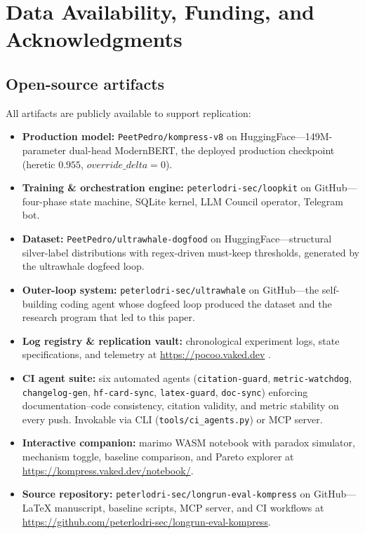 \section{Data Availability, Funding, and Acknowledgments}
\label{sec:data}

\subsection{Open-source artifacts}

All artifacts are publicly available to support replication:

\begin{itemize}
  \item \textbf{Production model:} \texttt{PeetPedro/kompress-v8} on
        HuggingFace---149M-parameter dual-head ModernBERT, the deployed
        production checkpoint (heretic $0.955$, $\mathit{override\_delta}{=}0$).
  \item \textbf{Training \& orchestration engine:}
        \texttt{peterlodri-sec/loopkit} on GitHub---four-phase state machine,
        SQLite kernel, LLM Council operator, Telegram bot.
  \item \textbf{Dataset:} \texttt{PeetPedro/ultrawhale-dogfood} on
        HuggingFace---structural silver-label distributions with regex-driven
        must-keep thresholds, generated by the ultrawhale dogfeed loop.
  \item \textbf{Outer-loop system:} \texttt{peterlodri-sec/ultrawhale} on
        GitHub---the self-building coding agent whose dogfeed loop produced
        the dataset and the research program that led to this paper.
  \item \textbf{Log registry \& replication vault:} chronological experiment
        logs, state specifications, and telemetry at
        \url{https://pocoo.vaked.dev}
        \citep{lodri2026sapirwhorf,lodri2026selflabeling,lodri2026heretic,
        lodri2026silverlabel,lodri2026loopkit,lodri2026loopshipped}.
  \item \textbf{CI agent suite:} six automated agents
        (\texttt{citation-guard}, \texttt{metric-watchdog},
        \texttt{changelog-gen}, \texttt{hf-card-sync}, \texttt{latex-guard},
        \texttt{doc-sync}) enforcing documentation--code consistency, citation
        validity, and metric stability on every push. Invokable via CLI
        (\texttt{tools/ci\_agents.py}) or MCP server.
  \item \textbf{Interactive companion:} marimo WASM notebook with paradox
        simulator, mechanism toggle, baseline comparison, and Pareto explorer at
        \url{https://kompress.vaked.dev/notebook/}.
  \item \textbf{Source repository:} \texttt{peterlodri-sec/longrun-eval-kompress}
        on GitHub---LaTeX manuscript, baseline scripts, MCP server, and
        CI workflows at \url{https://github.com/peterlodri-sec/longrun-eval-kompress}.
\end{itemize}

